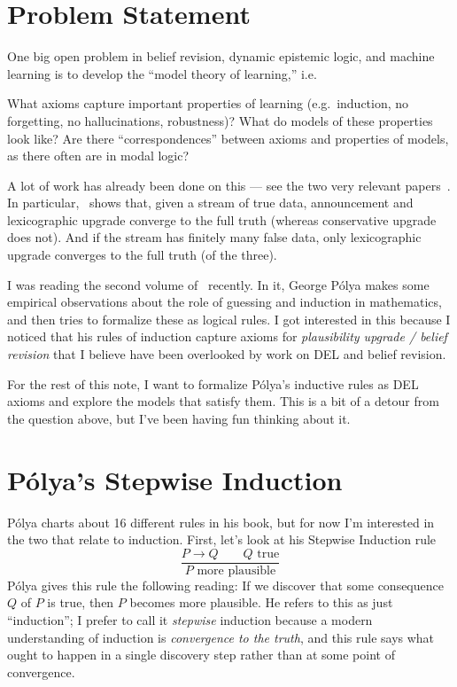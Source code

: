 \documentclass[letterpaper]{article}
\begin{document}
\section*{Problem Statement}

One big open problem in belief revision, dynamic epistemic logic, and machine learning is to develop the ``model theory of learning,'' i.e.

\begin{question}
    What axioms capture important properties of learning (e.g.\ induction, no forgetting, no hallucinations, robustness)? What do models of these properties look like? Are there “correspondences” between axioms and properties of models, as there often are in modal logic?
\end{question}

A lot of work has already been done on this --- see the two very relevant papers~\cite{truthtracking, dellearningtheory}.  In particular,~\cite{truthtracking} shows that, given a stream of true data, announcement and lexicographic upgrade converge to the full truth (whereas conservative upgrade does not).  And if the stream has finitely many false data, only lexicographic upgrade converges to the full truth (of the three).

I was reading the second volume of~\cite{polya1954mathematics} recently.  In it, George P\'{o}lya makes some empirical observations about the role of guessing and induction in mathematics, and then tries to formalize these as logical rules.  I got interested in this because I noticed that his rules of induction capture axioms for \emph{plausibility upgrade / belief revision} that I believe have been overlooked by work on DEL and belief revision.

For the rest of this note, I want to formalize P\'{o}lya's inductive rules as DEL axioms and explore the models that satisfy them.  This is a bit of a detour from the question above, but I've been having fun thinking about it.

\section*{P\'{o}lya's Stepwise Induction}

P\'{o}lya charts about 16 different rules in his book, but for now I'm interested in the two that relate to induction.  First, let's look at his Stepwise Induction rule
\[
    \frac{P \to Q \quad \quad Q \mbox{ true}}{P \mbox{ more plausible}}
\]
P\'{o}lya gives this rule the following reading: If we discover that some consequence $Q$ of $P$ is true, then $P$ becomes more plausible.  He refers to this as just ``induction''; I prefer to call it \emph{stepwise} induction because a modern understanding of induction is \emph{convergence to the truth}, and this rule says what ought to happen in a single discovery step rather than at some point of convergence.
\end{document}
